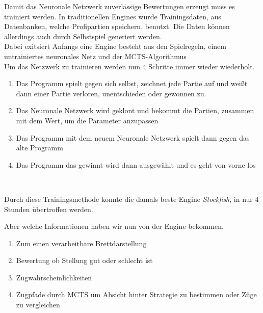 \newpage

Damit das Neuronale Netzwerk zuverlässige Bewertungen erzeugt muss es trainiert werden. In traditionellen Engines wurde Trainingsdaten, aus Datenbanken, welche Profipartien speichern, benutzt. Die Daten können allerdings auch durch Selbstspiel generiert werden.\\

Dabei exitsiert Anfangs eine Engine besteht aus den Spielregeln, einem untrainiertes neuronales Netz und der MCTS-Algorithmus\\

Um das Netzwerk zu trainieren werden nun 4 Schritte immer wieder wiederholt.

\begin{enumerate}[leftmargin=*]
\item Das Programm spielt gegen sich selbst, zeichnet jede Partie auf und weißt dann einer Partie verloren, unentschieden oder gewonnen zu.
\item Das Neuronale Netzwerk wird geklont und bekommt die Partien, zusammen mit dem Wert, um die Parameter anzupassen
\item Das Programm mit dem neuem Neuronale Netzwerk spielt dann gegen das alte Programm
\item Das Programm das gewinnt wird dann ausgewählt und es geht von vorne los
\end{enumerate}\

Durch diese Trainingsmethode konnte die damals beste Engine \textit{Stockfish}, in nur 4 Stunden übertroffen werden.

\newpage

Aber welche Informationen haben wir nun von der Engine bekommen.

\begin{enumerate}[leftmargin=*]
\item Zum einen verarbeitbare Brettdarstellung
\item Bewertung ob Stellung gut oder schlecht ist
\item Zugwahrscheinlichkeiten
\item Zugpfade durch MCTS um Absicht hinter Strategie zu bestimmen oder Züge zu vergleichen
\end{enumerate}